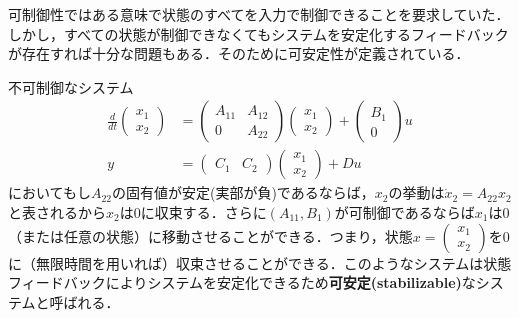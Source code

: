 可制御性ではある意味で状態のすべてを入力で制御できることを要求していた．しかし，すべての状態が制御できなくてもシステムを安定化するフィードバックが存在すれば十分な問題もある．そのために可安定性が定義されている．

不可制御なシステム
\begin{align}
 \frac{d}{dt}
  \left(\begin{array}{c}
         {x}_1 \\
	 {x}_2 
	\end{array}\right)
  &=
  \left(\begin{array}{cc}
         {A}_{11} & {A}_{12} \\
	     0        & {A}_{22}
	\end{array}\right)
  \left(\begin{array}{c}
         {x}_1 \\
	 {x}_2 
	\end{array}\right)
  +
  \left(\begin{array}{c}
         {B}_1 \\
	 0
	\end{array}\right)
  u 
\\
 y &=
  \left(\begin{array}{cc}
         {C}_1 & {C}_2 
	\end{array}\right)
  \left(\begin{array}{c}
         {x}_1 \\
	 {x}_2 
	\end{array}\right)
  + D u
\end{align}
においてもし$A_{22}$の固有値が安定(実部が負)であるならば，$x_2$の挙動は$\dot{x}_2 = A_{22} x_2$と表されるから$x_2$は$0$に収束する．さらに$(A_{11}, B_1)$が可制御であるならば$x_1$は$0$（または任意の状態）に移動させることができる．つまり，状態$x = \left(\begin{array}{c} {x}_1 \\ {x}_2 \end{array}\right)$を$0$に（無限時間を用いれば）収束させることができる．このようなシステムは状態フィードバックによりシステムを安定化できるため{\bf 可安定(stabilizable)}なシステムと呼ばれる．

